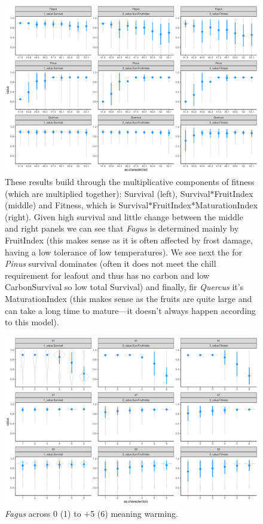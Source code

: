 \documentclass[11pt,letter]{article}
\begin{document}
\begin{figure} 
 \begin{center}
\noindent \includegraphics[width=1\textwidth]{..//analyses/graphs/phenofit/historical/fitnessBuildup.pdf}
  \caption{These results build through the multiplicative components of fitness (which are multiplied together): Survival (left), Survival$*$FruitIndex (middle) and Fitness, which is Survival$*$FruitIndex*MaturationIndex (right). Given high survival and little change between the middle and right panels we can see that \emph{Fagus} is determined mainly by FruitIndex (this makes sense as it is often affected by frost damage, having a low tolerance of low temperatures). We see next the for \emph{Pinus} survival dominates (often it does not meet the chill requirement for leafout and thus has no carbon and low CarbonSurvival so low total Survival) and finally, fir \emph{Quercus} it's MaturationIndex (this makes sense as the fruits are quite large and can take a long time to mature---it doesn't always happen according to this model). }
  \label{fig:historicalfitnessl}
  \end{center}
\end{figure}


\begin{figure} 
 \begin{center}
\noindent \includegraphics[width=1\textwidth]{..//analyses/graphs/phenofit/sims/metrics3/meansim_3metricsFS.pdf}
  \caption{\emph{Fagus} across 0 (1) to $+$5 (6) meaning warming.}
  \label{fig:fagusmean3}
  \end{center}
\end{figure}
\end{document}
